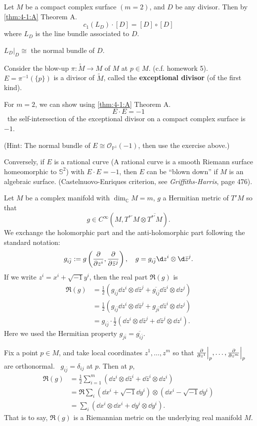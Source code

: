 \documentclass[12pt]{article}
\begin{document}
Let \(M\) be a compact complex surface \((m=2)\), and \(D\) be any divisor. Then by
\ifdefined\FullBook{} \cref{thm:4-1:A}
\else Theorem A.
\fi \[
  c_1(L_D)\cdot [D]=[D]\circ [D]
\] where \(L_D\) is the line bundle associated to \(D\).

\begin{exercise}
  \(L_D\Big|_{D}\cong\) the normal bundle of \(D\).
\end{exercise}

Consider the blow-up \(\pi\colon \tilde{M}\to M\) of \(M\) at \(p\in M\). (c.f. homework
5). \(E=\pi^{-1}(\{p\})\) is a divisor of \(\tilde{M}\), called the \textbf{
exceptional divisor} (of the first kind).

For \(m=2\), we can show using
\ifdefined\FullBook{} \cref{thm:4-1:A}
\else Theorem A.
\fi \[
  E\cdot E=-1
\] \ie\ the self-intersection of the exceptional divisor on a compact complex surface
is \(-1\).

(Hint: The normal bundle of \(E\cong \mathcal{O}_{\mathbb{P}^1}(-1)\), then use the
exercise above.)

Conversely, if \(E\) is a rational curve (A rational curve is a smooth Riemann surface
homeomorphic to \(\mathbb{S}^2\)) with \(E\cdot E=-1\), then \(E\) can be
``blown down'' if \(M\) is an algebraic surface. (Castelnuovo-Enriques criterion,
see \emph{Griffiths-Harris}, page 476). 

Let \(M\) be a complex manifold with \(\dim_{\mathbb{C}}M=m\), \(g\) a Hermitian metric
of \(T'M\) so that \[
  g\in C^\infty(M,T^{*\prime}M\otimes \overline{T^{*\prime}M})
.\] We exchange the holomorphic part and the anti-holomorphic part following the
standard notation: \[
  g_{i\bar{j}}:=g\left(\pd{z^i},\pd{\bar{z}^j}\right),\quad
  g=g_{i\bar{j}}\dd{z^i}\otimes \dd{\bar{z}^j}
.\] If we write \(z^i=x^i+\sqrt{-1}y^i\), then the real part \(\Re(g)\) is 
\begin{align*}
  \Re(g)&=\frac{1}{2}(g_{i\bar{j}}\dd{z^i}\otimes \dd{\bar{z}^j}
  +\overline{g_{i\bar{j}}}\dd{\bar{z}^i}\otimes \dd{z^j}) \\
  &=\frac{1}{2}(g_{i\bar{j}}\dd{z^i}\otimes \dd{\bar{z}^j}+g_{j\bar{i}}\dd{\bar{z}^i}
  \otimes \dd{z^j}) \\
  &=g_{i\bar{j}}\cdot \frac{1}{2}(\dd{z^i}\otimes \dd{\bar{z}^j}
  +\dd{\bar{z}^j}\otimes \dd{z^i})
.\end{align*}
Here we used the Hermitian property \(g_{j\bar{i}}=\overline{g_{i\bar{j}}}\).

Fix a point \(p\in M\), and take local coordinates \(z^1,\ldots,z^m\) so that
\(\pdv{}{z^1}\Big|_p,\ldots,\pdv{}{z^m}\Big|_p\) are orthonormal. \ie\ 
\(g_{i\bar{j}}=\delta_{ij}\) at \(p\). Then at \(p\),
\begin{align*}
  \Re(g)&=\frac{1}{2}\sum_{i=1}^{m}(\dd{z^i}\otimes \dd{\bar{z}^i}
  +\dd{\bar{z}^i}\otimes \dd{z^i}) \\
  &=\Re\sum_i (\dd{x^i}+\sqrt{-1}\dd{y^i})\otimes (\dd{x^i}-\sqrt{-1}\dd{y^i}) \\
  &=\sum_i(\dd{x^i}\otimes \dd{x^i}+\dd{y^i}\otimes \dd{y^i})
.\end{align*}
That is to say, \(\Re(g)\) is a Riemannian metric on the underlying real manifold
\(M\).
\end{document}
